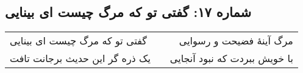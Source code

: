 \begin{center}
\section*{شماره ۱۷: گفتی تو که مرگ چیست ای بینایی}
\label{sec:017}
\begin{longtable}{l p{0.5cm} r}
گفتی تو که مرگ چیست ای بینایی
&&
مرگ آینهٔ فضیحت و رسوایی
\\
یک ذره گر این حدیث برجانت تافت
&&
با خویش ببردت که نبود آنجایی
\\
\end{longtable}
\end{center}
